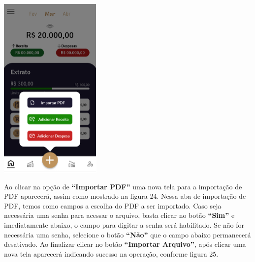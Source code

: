     \vspace{\baselineskip}
    \begin{center}
        \begin{minipage}{\textwidth}
            \centering
            \includegraphics[scale=0.6]{figs/img_455_adddesp.png}
            \label{fig:figura23}
        \end{minipage}
    \end{center}     

Ao clicar na opção de \textbf{“Importar PDF”} uma nova tela para a importação de PDF aparecerá, assim como mostrado na figura 24. Nessa aba de importação de PDF, temos como campos a escolha do PDF a ser importado. Caso seja necessária uma senha para acessar o arquivo, basta clicar no botão \textbf{“Sim”} e imediatamente abaixo, o campo para digitar a senha será habilitado. Se não for necessária uma senha, selecione o botão \textbf{“Não”} que o campo abaixo permanecerá desativado. Ao finalizar clicar no botão \textbf{“Importar Arquivo”}, após clicar uma nova tela aparecerá indicando sucesso na operação, conforme figura 25. 

